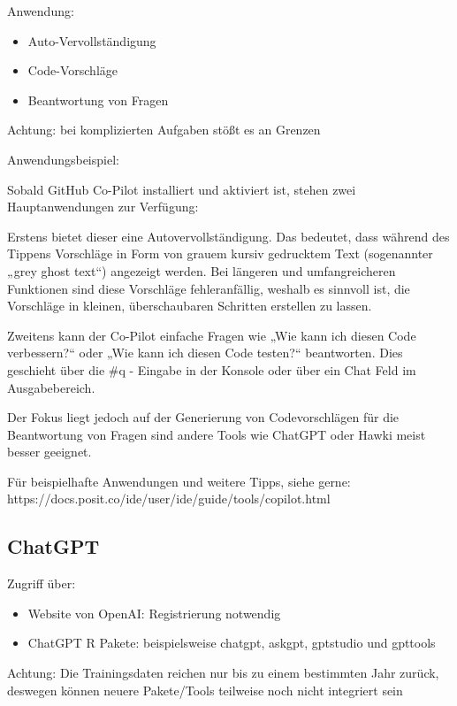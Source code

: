 \documentclass[
  letterpaper,
  DIV=11]{scrreprt}
\begin{document}
Anwendung:

\begin{itemize}
\item
  Auto-Vervollständigung
\item
  Code-Vorschläge
\item
  Beantwortung von Fragen
\end{itemize}

Achtung: bei komplizierten Aufgaben stößt es an Grenzen

Anwendungsbeispiel:

Sobald GitHub Co-Pilot installiert und aktiviert ist, stehen zwei
Hauptanwendungen zur Verfügung:

Erstens bietet dieser eine Autovervollständigung. Das bedeutet, dass
während des Tippens Vorschläge in Form von grauem kursiv gedrucktem Text
(sogenannter „grey ghost text``) angezeigt werden. Bei längeren und
umfangreicheren Funktionen sind diese Vorschläge fehleranfällig, weshalb
es sinnvoll ist, die Vorschläge in kleinen, überschaubaren Schritten
erstellen zu lassen.

Zweitens kann der Co-Pilot einfache Fragen wie „Wie kann ich diesen Code
verbessern?{}`` oder „Wie kann ich diesen Code testen?{}`` beantworten.
Dies geschieht über die \#q - Eingabe in der Konsole oder über ein Chat
Feld im Ausgabebereich.

Der Fokus liegt jedoch auf der Generierung von Codevorschlägen für die
Beantwortung von Fragen sind andere Tools wie ChatGPT oder Hawki meist
besser geeignet.

Für beispielhafte Anwendungen und weitere Tipps, siehe gerne:
https://docs.posit.co/ide/user/ide/guide/tools/copilot.html

\subsection{ChatGPT}\label{chatgpt}

Zugriff über:

\begin{itemize}
\item
  Website von OpenAI: Registrierung notwendig
\item
  ChatGPT R Pakete: beispielsweise chatgpt, askgpt, gptstudio und
  gpttools
\end{itemize}

Achtung: Die Trainingsdaten reichen nur bis zu einem bestimmten Jahr
zurück, deswegen können neuere Pakete/Tools teilweise noch nicht
integriert sein
\end{document}
